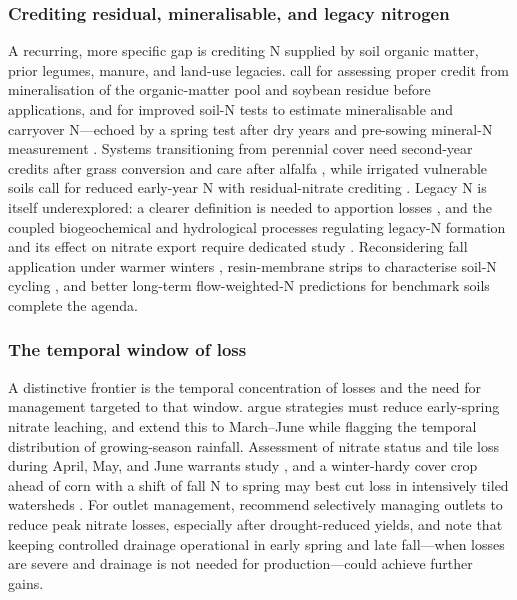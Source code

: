 \subsubsection{Crediting residual, mineralisable, and legacy nitrogen}

A recurring, more specific gap is crediting N supplied by soil organic matter,
prior legumes, manure, and land-use legacies. \textcite{Bakhsh2007,Bakhsh2005}
call for assessing proper credit from mineralisation of the organic-matter pool
and soybean residue before applications, and \textcite{Randall2001} for improved
soil-N tests to estimate mineralisable and carryover N---echoed by a spring test
after dry years \parencite{RANDALL1995} and pre-sowing mineral-N measurement
\parencite{Conrad2009}. Systems transitioning from perennial cover need
second-year credits after grass conversion \parencite{Huggins2001} and care
after alfalfa \parencite{ROBBINS1980}, while irrigated vulnerable soils call for
reduced early-year N with residual-nitrate crediting \parencite{Derby2009}.
Legacy N is itself underexplored: a clearer definition is needed to apportion
losses \parencite{Williams2022}, and the coupled biogeochemical and hydrological
processes regulating legacy-N formation and its effect on nitrate export require
dedicated study \parencite{Hu2024}. Reconsidering fall application under warmer
winters \parencite{Gentry2014}, resin-membrane strips to characterise soil-N
cycling \parencite{Masri2024}, and better long-term flow-weighted-N predictions
for benchmark soils \parencite{Skaggs2012} complete the agenda.

\subsubsection{The temporal window of loss}

A distinctive frontier is the temporal concentration of losses and the need for
management targeted to that window. \textcite{Bakhsh2007} argue strategies must
reduce early-spring nitrate leaching, and \textcite{Bakhsh2010} extend this to
March--June while flagging the temporal distribution of growing-season rainfall.
Assessment of nitrate status and tile loss during April, May, and June warrants
study \parencite{Nance2007}, and a winter-hardy cover crop ahead of corn with a
shift of fall N to spring may best cut loss in intensively tiled watersheds
\parencite{Gentry2024}. For outlet management, \textcite{Skaggs1995} recommend
selectively managing outlets to reduce peak nitrate losses, especially after
drought-reduced yields, and \textcite{Elmi2004,Elmi2002} note that keeping
controlled drainage operational in early spring and late fall---when losses are
severe and drainage is not needed for production---could achieve further gains.

